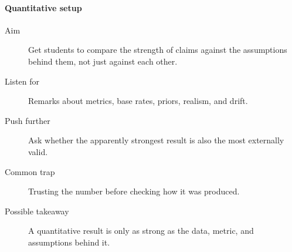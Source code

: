 \paragraph{Quantitative setup}
\begin{description}
  \item[Aim] Get students to compare the strength of claims against the
    assumptions behind them, not just against each other.
  \item[Listen for] Remarks about metrics, base rates, priors, realism, and
    drift.
  \item[Push further] Ask whether the apparently strongest result is also the
    most externally valid.
  \item[Common trap] Trusting the number before checking how it was produced.
  \item[Possible takeaway] A quantitative result is only as strong as the data,
    metric, and assumptions behind it.
\end{description}

%
%

